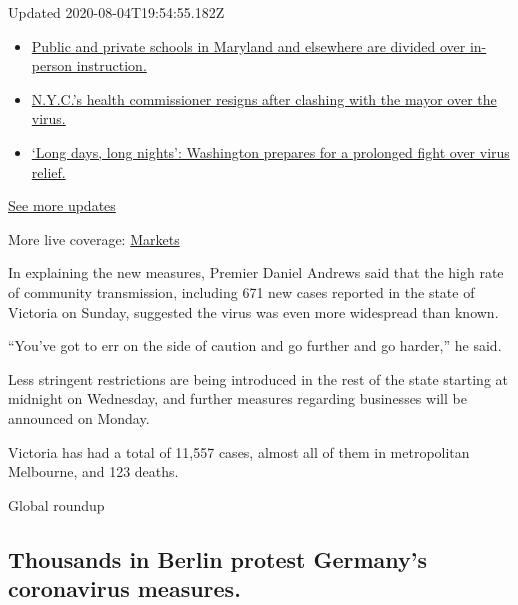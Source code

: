 Updated 2020-08-04T19:54:55.182Z

\begin{itemize}
\tightlist
\item
  \href{https://www.nytimes.com/2020/08/04/world/coronavirus-cases.html?action=click\&pgtype=Article\&state=default\&region=MAIN_CONTENT_1\&context=storylines_live_updates\#link-4825b93}{Public
  and private schools in Maryland and elsewhere are divided over
  in-person instruction.}
\item
  \href{https://www.nytimes.com/2020/08/04/world/coronavirus-cases.html?action=click\&pgtype=Article\&state=default\&region=MAIN_CONTENT_1\&context=storylines_live_updates\#link-4d1eafa8}{N.Y.C.'s
  health commissioner resigns after clashing with the mayor over the
  virus.}
\item
  \href{https://www.nytimes.com/2020/08/04/world/coronavirus-cases.html?action=click\&pgtype=Article\&state=default\&region=MAIN_CONTENT_1\&context=storylines_live_updates\#link-6b644638}{`Long
  days, long nights': Washington prepares for a prolonged fight over
  virus relief.}
\end{itemize}

\href{https://www.nytimes.com/2020/08/04/world/coronavirus-cases.html?action=click\&pgtype=Article\&state=default\&region=MAIN_CONTENT_1\&context=storylines_live_updates}{See
more updates}

More live coverage:
\href{https://www.nytimes.com/live/2020/08/04/business/stock-market-today-coronavirus?action=click\&pgtype=Article\&state=default\&region=MAIN_CONTENT_1\&context=storylines_live_updates}{Markets}

In explaining the new measures, Premier Daniel Andrews said that the
high rate of community transmission, including 671 new cases reported in
the state of Victoria on Sunday, suggested the virus was even more
widespread than known.

``You've got to err on the side of caution and go further and go
harder,'' he said.

Less stringent restrictions are being introduced in the rest of the
state starting at midnight on Wednesday, and further measures regarding
businesses will be announced on Monday.

Victoria has had a total of 11,557 cases, almost all of them in
metropolitan Melbourne, and 123 deaths.

Global roundup

\hypertarget{thousands-in-berlin-protest-germanys-coronavirus-measures}{%
\subsection{Thousands in Berlin protest Germany's coronavirus
measures.}\label{thousands-in-berlin-protest-germanys-coronavirus-measures}}

